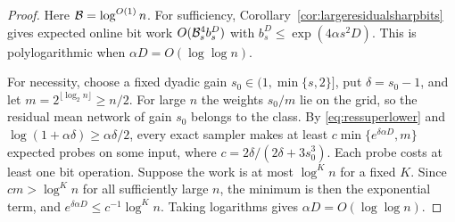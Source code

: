 \begin{proof}
Here $\mathcal B=\log^{O(1)}n$. For sufficiency,
Corollary~\ref{cor:largeresidualsharpbits} gives expected online bit
work $O(\mathcal B_s^4b_s^D)$ with $b_s^D\le\exp(4\alpha s^2D)$. This is
polylogarithmic when $\alpha D=O(\log\log n)$.

For necessity, choose a fixed dyadic gain
$s_0\in(1,\min\{s,2\}]$, put $\delta=s_0-1$, and let
$m=2^{\lfloor\log_2n\rfloor}\ge n/2$. For large $n$ the weights
$s_0/m$ lie on the grid, so the residual mean network of gain $s_0$
belongs to the class. By \eqref{eq:ressuperlower} and
$\log(1+\alpha\delta)\ge\alpha\delta/2$, every exact sampler makes
at least $c\min\{e^{\delta\alpha D},m\}$ expected probes on some
input, where $c=2\delta/(2\delta+3s_0^3)$. Each probe costs at least
one bit operation. Suppose the work is at most $\log^Kn$ for a fixed
$K$. Since $cm>\log^Kn$ for all sufficiently large $n$, the minimum
is then the exponential term, and $e^{\delta\alpha D}\le
c^{-1}\log^Kn$. Taking logarithms gives $\alpha D=O(\log\log n)$.
\end{proof}
